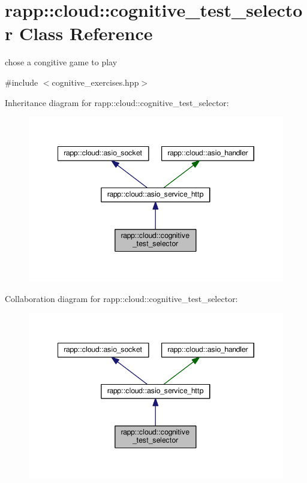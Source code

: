 \hypertarget{classrapp_1_1cloud_1_1cognitive__test__selector}{\section{rapp\-:\-:cloud\-:\-:cognitive\-\_\-test\-\_\-selector Class Reference}
\label{classrapp_1_1cloud_1_1cognitive__test__selector}
}


chose a congitive game to play  




{\ttfamily \#include $<$cognitive\-\_\-exercises.\-hpp$>$}



Inheritance diagram for rapp\-:\-:cloud\-:\-:cognitive\-\_\-test\-\_\-selector\-:
\nopagebreak
\begin{figure}[H]
\begin{center}
\leavevmode
\includegraphics[width=345pt]{classrapp_1_1cloud_1_1cognitive__test__selector__inherit__graph}
\end{center}
\end{figure}


Collaboration diagram for rapp\-:\-:cloud\-:\-:cognitive\-\_\-test\-\_\-selector\-:
\nopagebreak
\begin{figure}[H]
\begin{center}
\leavevmode
\includegraphics[width=345pt]{classrapp_1_1cloud_1_1cognitive__test__selector__coll__graph}
\end{center}
\end{figure}
